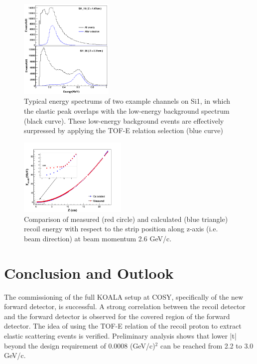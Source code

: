 \documentclass[number,5p]{elsarticle}
\begin{document}
\begin{figure}[h!]
  \centering
  \includegraphics[width=0.4\textwidth]{./comparison_tof_e_cut.png}
  \caption{Typical energy spectrums of two example channels on Si1, in which the elastic peak overlaps with the low-energy background spectrum (black curve). These low-energy background events are effectively surpressed by applying the TOF-E relation selection (blue curve)}
  \label{fig:cut}
\end{figure}


\begin{figure}[h!]
  \centering
  \includegraphics[width=0.46\textwidth]{./calc_vs_measured_combined.png}
  \caption{
    Comparison of measured (red circle) and calculated (blue triangle) recoil energy with respect to the strip position along z-axis (i.e. beam direction) at beam momentum 2.6 GeV/c.}
  \label{fig:measured_vs_calculated}
\end{figure}


\section{Conclusion and Outlook}
\label{sec:conclusion}

The commissioning of the full KOALA setup at COSY, specifically of the new forward detector, is successful.
A strong correlation between the recoil detector and the forward detector is
observed for the covered region of the forward detector.
The idea of using the TOF-E relation of the recoil proton to extract elastic
scattering events is verified.
Preliminary analysis shows that lower |t| beyond the design requirement of 0.0008 (GeV/c)$^2$ can be reached from 2.2 to 3.0 GeV/c. 
\end{document}
